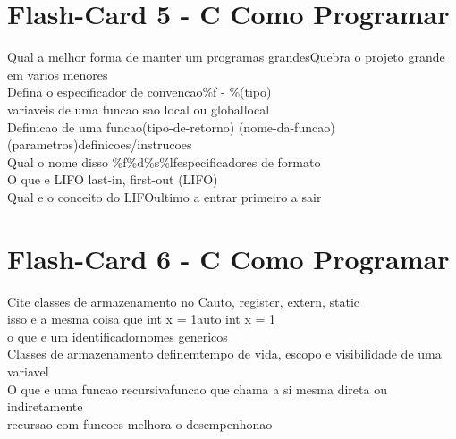 \documentclass[a4paper,12pt]{article}
\begin{document}
\section*{Flash-Card 5 - C Como Programar} 
Qual a melhor forma de manter um programas grandes\dotfill Quebra o projeto grande em varios menores\\ 
Defina o especificador de convencao\dotfill\%f - \%(tipo)\\ 
variaveis de uma funcao sao local ou global\dotfill local\\ 
Definicao de uma funcao\dotfill (tipo-de-retorno) (nome-da-funcao)(parametros){definicoes/instrucoes}\\ 
Qual o nome disso \%f\%d\%s\%lf\dotfill especificadores de formato\\ 
O que e LIFO \dotfill last-in, first-out (LIFO)\\ 
Qual e o conceito do LIFO\dotfill ultimo a entrar primeiro a sair\\ 

\section*{Flash-Card 6 - C Como Programar} 
Cite classes de armazenamento no C\dotfill auto, register, extern, static\\ 
isso e a mesma coisa que int x = 1\dotfill auto int x = 1\\ 
o que e um identificador\dotfill nomes genericos\\ 
Classes de armazenamento definem\dotfill tempo de vida, escopo e visibilidade de uma variavel\\ 
O que e uma funcao recursiva\dotfill funcao que chama a si mesma direta ou indiretamente\\
recursao com funcoes melhora o desempenho\dotfill nao\\ 
\end{document}
